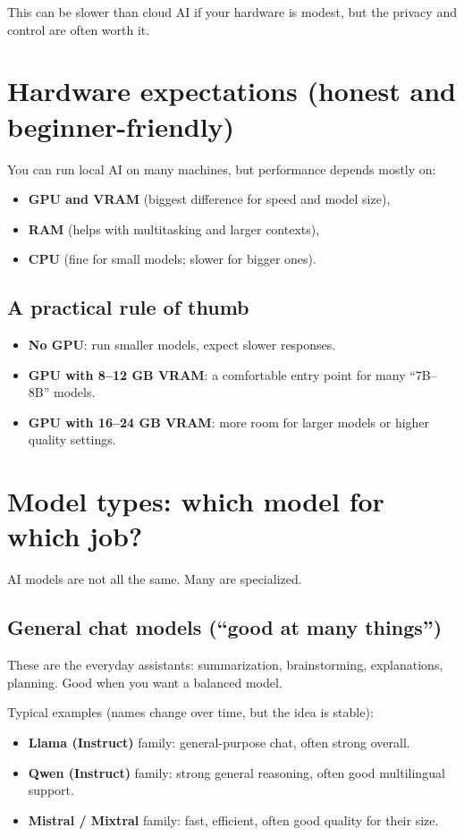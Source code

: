 This can be slower than cloud AI if your hardware is modest, but the privacy and control are often worth it.

\section{Hardware expectations (honest and beginner-friendly)}
You can run local AI on many machines, but performance depends mostly on:
\begin{itemize}[leftmargin=*]
  \item \textbf{GPU and VRAM} (biggest difference for speed and model size),
  \item \textbf{RAM} (helps with multitasking and larger contexts),
  \item \textbf{CPU} (fine for small models; slower for bigger ones).
\end{itemize}

\subsection*{A practical rule of thumb}
\begin{itemize}[leftmargin=*]
  \item \textbf{No GPU}: run smaller models, expect slower responses.
  \item \textbf{GPU with 8--12 GB VRAM}: a comfortable entry point for many ``7B--8B'' models.
  \item \textbf{GPU with 16--24 GB VRAM}: more room for larger models or higher quality settings.
\end{itemize}


\section{Model types: which model for which job?}
AI models are not all the same. Many are specialized.

\subsection{General chat models (``good at many things'')}
These are the everyday assistants: summarization, brainstorming, explanations, planning.
Good when you want a balanced model.

Typical examples (names change over time, but the idea is stable):
\begin{itemize}[leftmargin=*]
  \item \textbf{Llama (Instruct)} family: general-purpose chat, often strong overall.
  \item \textbf{Qwen (Instruct)} family: strong general reasoning, often good multilingual support.
  \item \textbf{Mistral / Mixtral} family: fast, efficient, often good quality for their size.
\end{itemize}

